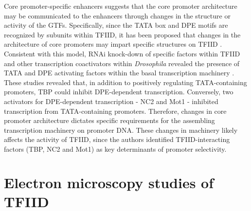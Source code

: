\indent Core promoter-specific enhancers suggests that the core promoter architecture may be communicated to the enhancers through changes in the structure or activity of the GTFs. Specifically, since the TATA box and DPE motifs are recognized by subunits within TFIID, it has been proposed that changes in the architecture of core promoters may impart specific structures on TFIID \cite{Ohtsuki_2485}. Consistent with this model, RNAi knock-down of specific factors within TFIID and other transcription coactivators within \emph{Drosophila} revealed the presence of TATA and DPE activating factors within the basal transcription machinery \cite{Hsu_811}. These studies revealed that, in addition to positively regulating TATA-containing promoters, TBP could inhibit DPE-dependent transcription.  Conversely, two activators for DPE-dependent transcription - NC2 and Mot1 - inhibited transcription from TATA-containing promoters. Therefore, changes in core promoter architecture dictates specific requirements for the assembling transcription machinery on promoter DNA. These changes in machinery likely affects the activity of TFIID, since the authors identified TFIID-interacting factors (TBP, NC2 and Mot1) as key determinants of promoter selectivity. \\

\section{Electron microscopy studies of TFIID}


